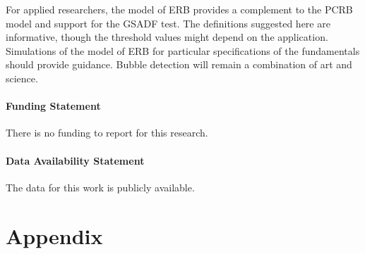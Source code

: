 \documentclass[12pt]{article}
\renewcommand{\thetable}{\Roman{table}}
\begin{document}
For applied researchers, the model of ERB provides a complement to the PCRB model and support for the GSADF test. The definitions suggested here are informative, though the threshold values might depend on the application. Simulations of the model of ERB for particular specifications of the fundamentals should provide guidance. Bubble detection will remain a combination of art and science.

\pagebreak

\paragraph{Funding Statement}
There is no funding to report for this research.

\paragraph{Data Availability Statement}
The data for this work is publicly available.

\pagebreak

\section*{Appendix}
\renewcommand{\thetable}{A.\arabic{table}}
\setcounter{table}{0}
\end{document}
